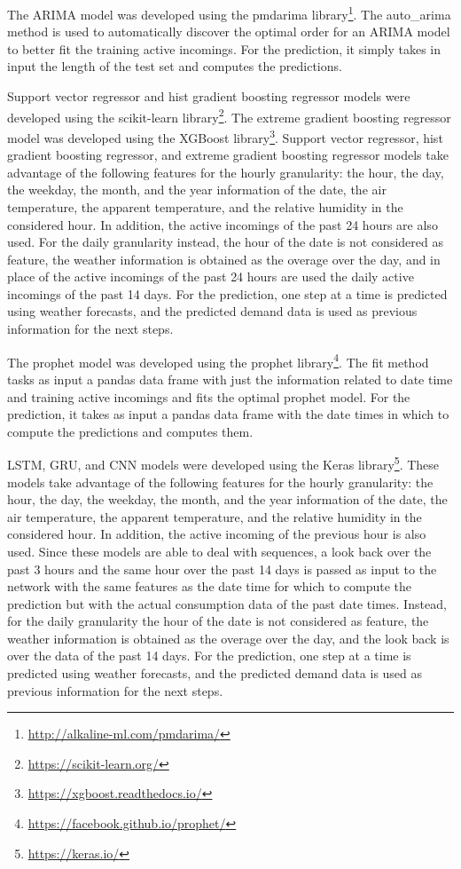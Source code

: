 The ARIMA model was developed using the pmdarima library\footnote{ \url{http://alkaline-ml.com/pmdarima/} }.
The auto\_arima method is used to automatically discover the optimal order for an ARIMA model to better fit the training active incomings.
For the prediction, it simply takes in input the length of the test set and computes the predictions.

Support vector regressor and hist gradient boosting regressor models were developed using the scikit-learn library\footnote{ \url{https://scikit-learn.org/} }.
The extreme gradient boosting regressor model was developed using the XGBoost library\footnote{ \url{https://xgboost.readthedocs.io/} }.
Support vector regressor, hist gradient boosting regressor, and extreme gradient boosting regressor models take advantage of the following features for the hourly granularity: the hour, the day, the weekday, the month, and the year information of the date, the air temperature, the apparent temperature, and the relative humidity in the considered hour.
In addition, the active incomings of the past 24 hours are also used.
For the daily granularity instead, the hour of the date is not considered as feature, the weather information is obtained as the overage over the day, and in place of the active incomings of the past 24 hours are used the daily active incomings of the past 14 days.
For the prediction, one step at a time is predicted using weather forecasts, and the predicted demand data is used as previous information for the next steps.

The prophet model was developed using the prophet library\footnote{ \url{https://facebook.github.io/prophet/} }.
The fit method tasks as input a pandas data frame with just the information related to date time and training active incomings and fits the optimal prophet model.
For the prediction, it takes as input a pandas data frame with the date times in which to compute the predictions and computes them.

LSTM, GRU, and CNN models were developed using the Keras library\footnote{ \url{https://keras.io/} }.
These models take advantage of the following features for the hourly granularity: the hour, the day, the weekday, the month, and the year information of the date, the air temperature, the apparent temperature, and the relative humidity in the considered hour.
In addition, the active incoming of the previous hour is also used.
Since these models are able to deal with sequences, a look back over the past 3 hours and the same hour over the past 14 days is passed as input to the network with the same features as the date time for which to compute the prediction but with the actual consumption data of the past date times.
Instead, for the daily granularity the hour of the date is not considered as feature, the weather information is obtained as the overage over the day, and the look back is over the data of the past 14 days.
For the prediction, one step at a time is predicted using weather forecasts, and the predicted demand data is used as previous information for the next steps.

